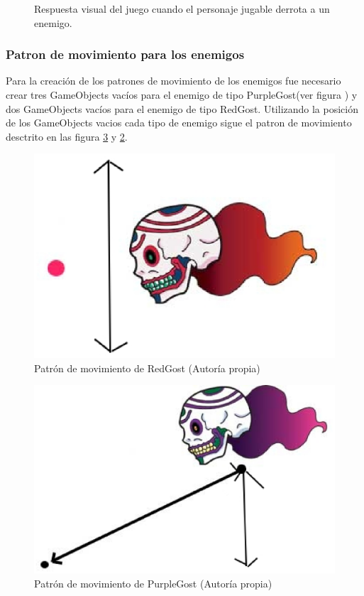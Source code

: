 \begin{figure}
  \centering
  
   

  \caption{Respuesta visual del juego cuando el personaje jugable derrota a un enemigo.}
  \label{figPersonajeResXo}
\end{figure}     
 
 \subsubsection{Patron de movimiento para los enemigos}
 Para la creación de los patrones de movimiento de los enemigos fue necesario  
 crear tres GameObjects vacíos para el enemigo de tipo PurpleGost(ver figura ) y dos 
 GameObjects vacíos para el enemigo de tipo RedGost. Utilizando la posición de los 
 GameObjects vacios cada tipo de enemigo sigue el patron de movimiento desctrito en las 
 figura \ref{figPurpleGost} y \ref{figRedGost}.  

\begin{figure}
  \centering
   \includegraphics[width=0.4 \textwidth]{05TrabajoRealizado/03Unity/imagenes/disparoRojo}
  \caption{Patrón de movimiento de RedGost (Autoría propia)}
  \label{figRedGost}
\end{figure}

\begin{figure}
  \centering
   \includegraphics[width=0.4 \textwidth]{05TrabajoRealizado/03Unity/imagenes/embestida}
  \caption{Patrón de movimiento de PurpleGost (Autoría propia)}
  \label{figPurpleGost}
\end{figure}